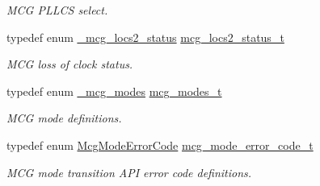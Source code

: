 \begin{DoxyCompactItemize}
\begin{DoxyCompactList}\small\item\em M\+CG P\+L\+L\+CS select. \end{DoxyCompactList}\item 
typedef enum \hyperlink{group__mcg__hal_ga219cdb1356ea8768f2f1c1867b3f2912}{\+\_\+mcg\+\_\+locs2\+\_\+status} \hyperlink{group__mcg__hal_ga11144c52a3268b4b288f0b3d9bfdc4ca}{mcg\+\_\+locs2\+\_\+status\+\_\+t}\hypertarget{group__mcg__hal_ga11144c52a3268b4b288f0b3d9bfdc4ca}{}\label{group__mcg__hal_ga11144c52a3268b4b288f0b3d9bfdc4ca}

\begin{DoxyCompactList}\small\item\em M\+CG loss of clock status. \end{DoxyCompactList}\item 
typedef enum \hyperlink{group__mcg__hal_gacbfe9563601260b279eeb6d4a8c701e0}{\+\_\+mcg\+\_\+modes} \hyperlink{group__mcg__hal_ga45a80628effb092af4a7a4a381477b91}{mcg\+\_\+modes\+\_\+t}\hypertarget{group__mcg__hal_ga45a80628effb092af4a7a4a381477b91}{}\label{group__mcg__hal_ga45a80628effb092af4a7a4a381477b91}

\begin{DoxyCompactList}\small\item\em M\+CG mode definitions. \end{DoxyCompactList}\item 
typedef enum \hyperlink{group__mcg__hal_ga2ab548eca13afeee8091a03bee7a68d0}{Mcg\+Mode\+Error\+Code} \hyperlink{group__mcg__hal_ga1654e118f0f01c2925671b0fdce8a389}{mcg\+\_\+mode\+\_\+error\+\_\+code\+\_\+t}\hypertarget{group__mcg__hal_ga1654e118f0f01c2925671b0fdce8a389}{}\label{group__mcg__hal_ga1654e118f0f01c2925671b0fdce8a389}

\begin{DoxyCompactList}\small\item\em M\+CG mode transition A\+PI error code definitions. \end{DoxyCompactList}\end{DoxyCompactItemize}
